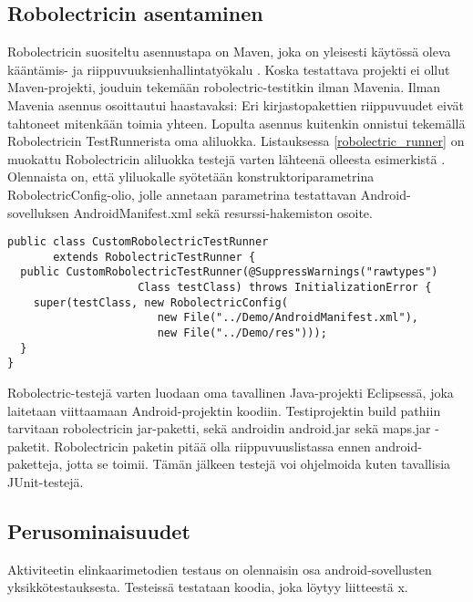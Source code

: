 \subsection{Robolectricin asentaminen}
\label{robolectric_install}

Robolectricin suositeltu asennustapa on Maven, joka on yleisesti käytössä oleva kääntämis- ja riippuvuuksienhallintatyökalu \cite{maven}. Koska testattava projekti ei ollut Maven-projekti, jouduin tekemään robolectric-testitkin ilman Mavenia. Ilman Mavenia asennus osoittautui haastavaksi: Eri kirjastopakettien riippuvuudet eivät tahtoneet mitenkään toimia yhteen. Lopulta asennus kuitenkin onnistui tekemällä Robolectricin TestRunnerista oma aliluokka. Listauksessa \ref{robolectric_runner} on muokattu Robolectricin aliluokka testejä varten lähteenä olleesta esimerkistä \cite{sample_runner}. Olennaista on, että yliluokalle syötetään konstruktoriparametrina RobolectricConfig-olio, jolle annetaan parametrina testattavan Android-sovelluksen AndroidManifest.xml sekä resurssi-hakemiston osoite.

\begin{lstlisting}[float,label=robolectric_runner,caption=CustomRobolectricTestRunner]
public class CustomRobolectricTestRunner 
       extends RobolectricTestRunner {
  public CustomRobolectricTestRunner(@SuppressWarnings("rawtypes")
                    Class testClass) throws InitializationError {
  	super(testClass, new RobolectricConfig(
                       new File("../Demo/AndroidManifest.xml"), 
                       new File("../Demo/res")));
  }
}
\end{lstlisting}

Robolectric-testejä varten luodaan oma tavallinen Java-projekti Eclipsessä, joka laitetaan viittaamaan Android-projektin koodiin. Testiprojektin build pathiin tarvitaan robolectricin jar-paketti, sekä androidin android.jar sekä maps.jar -paketit. Robolectricin paketin pitää olla riippuvuuslistassa ennen android-paketteja, jotta se toimii. Tämän jälkeen testejä voi ohjelmoida kuten tavallisia JUnit-testejä.

\subsection{Perusominaisuudet}
\label{basic_unittests}

Aktiviteetin elinkaarimetodien testaus on olennaisin osa android-sovellusten yksikkötestauksesta. Testeissä testataan koodia, joka löytyy liitteestä x.

